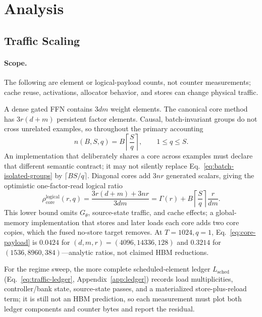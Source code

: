 \section{Analysis}
\label{sec:analysis}

\subsection{Traffic Scaling}

\paragraph{Scope.} The following are element or logical-payload counts, not
counter measurements; cache reuse, activations, allocator behavior, and
stores can change physical traffic.

A dense gated FFN contains $3dm$ weight elements.  The canonical core method
has $3r(d+m)$ persistent factor elements.  Causal, batch-invariant groups do
not cross unrelated examples, so throughout the primary accounting
\begin{equation}
n(B,S,q)=B\left\lceil\frac{S}{q}\right\rceil,
\qquad 1\le q\le S.
\label{eq:batch-isolated-groups}
\end{equation}
An implementation that deliberately shares a core across examples must declare
that different semantic contract; it may not silently replace
Eq.~\eqref{eq:batch-isolated-groups} by $\lceil BS/q\rceil$.  Diagonal cores
add $3nr$ generated scalars, giving the optimistic one-factor-read logical ratio
\begin{equation}
\rho_{\mathrm{core}}^{\mathrm{logical}}(r,q)
=\frac{3r(d+m)+3nr}{3dm}
=\Gamma(r)+B\left\lceil\frac{S}{q}\right\rceil\frac{r}{dm}.
\label{eq:core-payload}
\end{equation}
This lower bound omits $G_\theta$, source-state traffic, and cache effects; a
global-memory implementation that stores and later loads each core adds two
core copies, which the fused no-store target removes. At $T{=}1024,q{=}1$,
Eq.~\eqref{eq:core-payload} is $0.0424$ for $(d,m,r)=(4096,14336,128)$ and
$0.3214$ for $(1536,8960,384)$---analytic ratios, not claimed HBM
reductions.

For the regime sweep, the more complete scheduled-element ledger
$L_{\mathrm{sched}}$ (Eq.~\eqref{eq:traffic-ledger},
Appendix~\ref{app:ledger}) records load multiplicities, controller/bank
state, source-state passes, and a materialized store-plus-reload term; it
is still not an HBM prediction, so each measurement must plot both ledger
components and counter bytes and report the residual.

